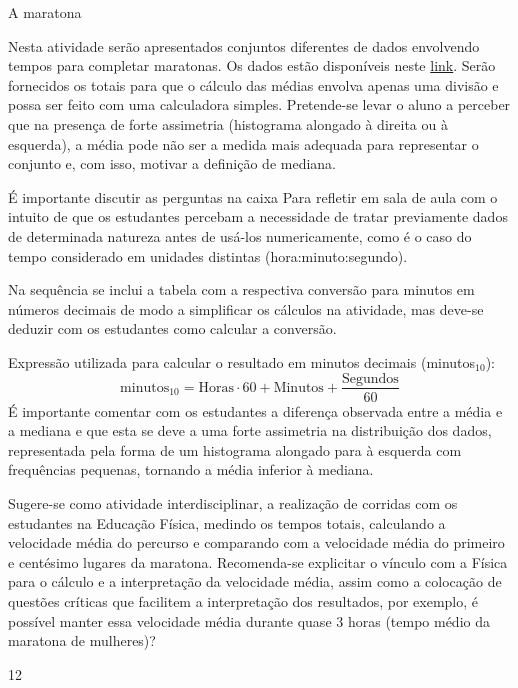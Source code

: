 \begin{sugestions}{A maratona}
{
Nesta atividade serão apresentados conjuntos diferentes de dados envolvendo tempos para completar maratonas. Os dados estão disponíveis neste \href{https://www.geogebra.org/m/ZhqKD9Nz}{link}. Serão fornecidos os totais para que o cálculo das médias envolva apenas uma divisão e possa ser feito com uma calculadora simples. Pretende-se levar o aluno a perceber que na presença de forte assimetria (histograma alongado à direita ou à esquerda), a média pode não ser a medida mais adequada para representar o conjunto e, com isso, motivar a definição de mediana.

É importante discutir as perguntas na caixa Para refletir em sala de aula com o intuito de que os estudantes percebam a necessidade de tratar previamente dados de determinada natureza antes de usá-los numericamente, como é o caso do tempo considerado em unidades distintas (hora:minuto:segundo).

Na sequência se inclui a tabela com a respectiva conversão para minutos em números decimais de modo a simplificar os cálculos na atividade, mas deve-se deduzir com os estudantes como calcular a conversão.

Expressão utilizada para calcular o resultado em minutos decimais (minutos$_{10}$):
\begin{equation*}
\text{minutos}_{10}=\text{Horas}\cdot60+\text{Minutos}+\frac{\text{Segundos}}{60}
\end{equation*}
É importante comentar com os estudantes a diferença observada entre a média e a mediana e que esta se deve a uma forte assimetria na distribuição dos dados, representada pela forma de um histograma alongado para à esquerda com frequências pequenas, tornando a média inferior à mediana.

Sugere-se como atividade interdisciplinar, a realização de corridas com os estudantes na Educação Física, medindo os tempos totais, calculando a velocidade média do percurso e comparando com a velocidade média do primeiro e centésimo lugares da maratona. Recomenda-se explicitar o vínculo com a Física para o cálculo e a interpretação da velocidade média, assim como a colocação de questões críticas que facilitem a interpretação dos resultados, por exemplo, é possível manter essa velocidade média durante quase $3$ horas (tempo médio da maratona de mulheres)?
}{1}{2}
\end{sugestions}
\clearmargin
\marginpar{\vspace{.5em}}

